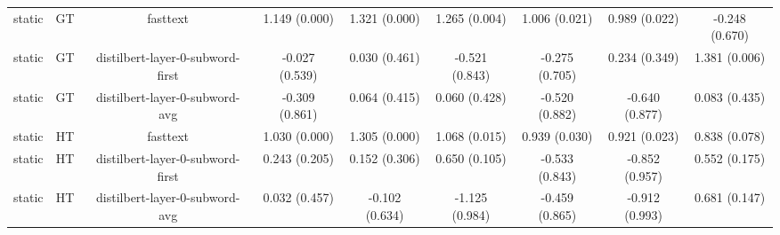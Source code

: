 \begin{sidewaystable}[htb]
\begin{tabular}{@{}ccccccccc@{}}
        static & GT & fasttext & 1.149 (0.000) & 1.321 (0.000) & 1.265 (0.004) & 1.006 (0.021) & 0.989 (0.022) & -0.248 (0.670) \\
        static & GT & distilbert-layer-0-subword-first & -0.027 (0.539) & 0.030 (0.461) & -0.521 (0.843) & -0.275 (0.705) & 0.234 (0.349) & 1.381 (0.006) \\
        static & GT & distilbert-layer-0-subword-avg & -0.309 (0.861) & 0.064 (0.415) & 0.060 (0.428) & -0.520 (0.882) & -0.640 (0.877) & 0.083 (0.435) \\
        static & HT & fasttext & 1.030 (0.000) & 1.305 (0.000) & 1.068 (0.015) & 0.939 (0.030) & 0.921 (0.023) & 0.838 (0.078) \\
        static & HT & distilbert-layer-0-subword-first & 0.243 (0.205) & 0.152 (0.306) & 0.650 (0.105) & -0.533 (0.843) & -0.852 (0.957) & 0.552 (0.175) \\
        static & HT & distilbert-layer-0-subword-avg & 0.032 (0.457) & -0.102 (0.634) & -1.125 (0.984) & -0.459 (0.865) & -0.912 (0.993) & 0.681 (0.147) \\
        \bottomrule
    \end{tabular}
\end{sidewaystable}